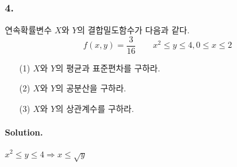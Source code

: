 \subsubsection{4.} 연속확률변수 $X$와 $Y$의 결합밀도함수가 다음과 같다. \[f\left(x, y\right)=\dfrac{3}{16}\qquad x^2\leq y\leq 4, 0\leq x\leq 2\]

\begin{itemize}
  \item [(1)] $X$와 $Y$의 평균과 표준편차를 구하라.
  \item [(2)] $X$와 $Y$의 공분산을 구하라.
  \item [(3)] $X$와 $Y$의 상관계수를 구하라.
\end{itemize}

\paragraph{Solution.} $x^2\leq y\leq 4 \Rightarrow x\leq \sqrt{y}$

